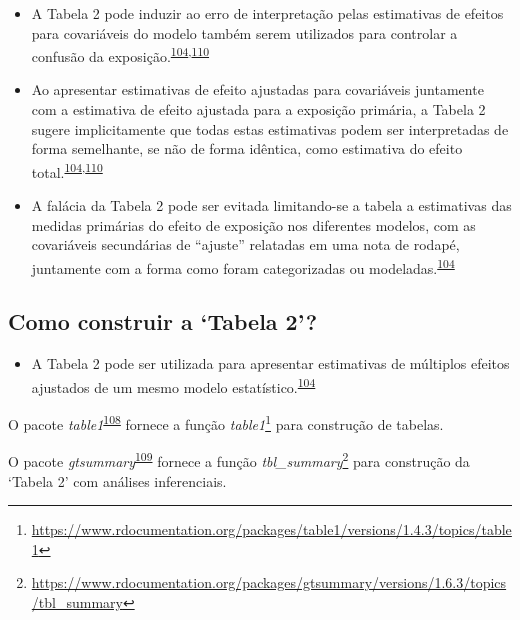 \documentclass[
  a4paper,
]{book}
\providecommand{\tightlist}{%
  \setlength{\itemsep}{0pt}\setlength{\parskip}{0pt}}
\renewcommand{\href}[2]{#2\footnote{\url{#1}}}
\newenvironment{infobox}[1]
  {
  \begin{itemize}
  \renewcommand{\labelitemi}{
    \raisebox{-.7\height}[0pt][0pt]{
      {\setkeys{Gin}{width=3em,keepaspectratio}
        \texttt{[image: \#1]}}
    }
  }
  \setlength{\fboxsep}{1em}
  \begin{blackbox}
  \item
  }
  {
  \end{blackbox}
  \end{itemize}
  }
\begin{document}
\begin{itemize}
\item
  A Tabela 2 pode induzir ao erro de interpretação pelas estimativas de efeitos para covariáveis do modelo também serem utilizados para controlar a confusão da exposição.\textsuperscript{\protect\hyperlink{ref-Westreich2013}{104},\protect\hyperlink{ref-bandoli2018}{110}}
\item
  Ao apresentar estimativas de efeito ajustadas para covariáveis juntamente com a estimativa de efeito ajustada para a exposição primária, a Tabela 2 sugere implicitamente que todas estas estimativas podem ser interpretadas de forma semelhante, se não de forma idêntica, como estimativa do efeito total.\textsuperscript{\protect\hyperlink{ref-Westreich2013}{104},\protect\hyperlink{ref-bandoli2018}{110}}
\item
  A falácia da Tabela 2 pode ser evitada limitando-se a tabela a estimativas das medidas primárias do efeito de exposição nos diferentes modelos, com as covariáveis secundárias de ``ajuste'' relatadas em uma nota de rodapé, juntamente com a forma como foram categorizadas ou modeladas.\textsuperscript{\protect\hyperlink{ref-Westreich2013}{104}}
\end{itemize}

\hypertarget{como-construir-a-tabela-2}{%
\subsection{Como construir a `Tabela 2'?}\label{como-construir-a-tabela-2}}

\begin{itemize}
\tightlist
\item
  A Tabela 2 pode ser utilizada para apresentar estimativas de múltiplos efeitos ajustados de um mesmo modelo estatístico.\textsuperscript{\protect\hyperlink{ref-Westreich2013}{104}}
\end{itemize}

\begin{infobox}{images/Rlogo}
O pacote \emph{table1}\textsuperscript{\protect\hyperlink{ref-table1}{108}} fornece a função \href{https://www.rdocumentation.org/packages/table1/versions/1.4.3/topics/table1}{\emph{table1}} para construção de tabelas.

\end{infobox}

\begin{infobox}{images/Rlogo}
O pacote \emph{gtsummary}\textsuperscript{\protect\hyperlink{ref-gtsummary-2}{109}} fornece a função \href{https://www.rdocumentation.org/packages/gtsummary/versions/1.6.3/topics/tbl_summary}{\emph{tbl\_summary}} para construção da `Tabela 2' com análises inferenciais.

\end{infobox}
\end{document}
